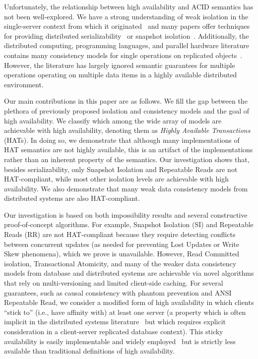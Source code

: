 Unfortunately, the relationship between high availability and ACID
semantics has not been well-explored. We have a strong understanding
of weak isolation in the single-server context from which it
originated~\cite{adya, ansicritique, gray-isolation} and many papers
offer techniques for providing distributed
serializability~\cite{bernstein-book, spanner, daudjee-session,
  hstore, krikellas-bargain, calvin, kemme-classification} or snapshot
isolation~\cite{daudjee-snapshot,generalizedsnapshot, kemme-snapshot,
  walter}. Additionally, the distributed computing, programming
languages, and parallel hardware literature contains many
consistency models for single operations on replicated objects~\cite{
  ceri-mechanism, chen-mechanism, pnuts, herlihy-art, eiger, cac,
  sessionguarantees}. However, the literature has largely ignored
semantic guarantees for multiple operations operating on multiple data
items in a highly available distributed environment.

Our main contributions in this paper are as follows. We fill the gap
between the plethora of previously proposed isolation and consistency
models and the goal of high availability.  We classify which among the
wide array of models are achievable with high availability, denoting
them as {\em Highly Available Transactions} (HATs). In doing so, we
demonstrate that although many implementations of HAT semantics are
not highly available, this is an artifact of the implementations
rather than an inherent property of the semantics. Our investigation
shows that, besides serializability, only Snapshot Isolation and
Repeatable Reads are not HAT-compliant, while most other isolation
levels are achievable with high availability. We also demonstrate that
many weak data consistency models from distributed systems are also
HAT-compliant.

Our investigation is based on both impossibility results and several
constructive proof-of-concept algorithms. For example, Snapshot
Isolation (SI) and Repeatable Reads (RR) are not HAT-compliant because
they require detecting conflicts between concurrent updates (as needed
for preventing Lost Updates or Write Skew phenomena), which we prove
is unavailable. However, Read Committed isolation, Transactional
Atomicity, and many of the weaker data consistency models from
database and distributed systems are achievable via novel algorithms
that rely on multi-versioning and limited client-side caching. For
several guarantees, such as causal consistency with phantom prevention
and ANSI Repeatable Read, we consider a modified form of high
availability in which clients ``stick to'' (i.e., have affinity with)
at least one server (a property which is often implicit in the
distributed systems literature~\cite{herlihy-art, eiger, cac} but
which requires explicit consideration in a client-server replicated
database context). This sticky availability is easily implementable
and widely employed~\cite{eiger, vogels-defs} but is strictly less
available than traditional definitions of high availability.


